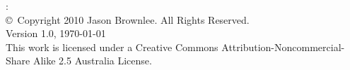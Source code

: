 



\begin{flushleft}
%
\mybooktitle: \mybooksubtitle \\
\copyright\ Copyright 2010 Jason Brownlee. All Rights Reserved. \\
\small{
Version 1.0, \today \\
This work is licensed under a Creative Commons Attribution-Noncommercial-Share Alike 2.5 Australia License.
}
%
\end{flushleft}

\hfill


	
\vfill\vfill\vfill